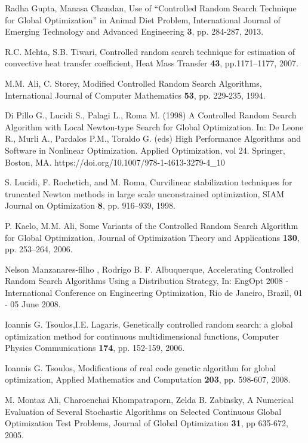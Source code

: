 \documentclass[symmetry,article,submit,moreauthors,pdftex]{Definitions/mdpi}
\begin{document}
\begin{thebibliography}{10}
Radha Gupta, Manasa Chandan, Use of \textquotedblleft Controlled
Random Search Technique for Global Optimization\textquotedblright{}
in Animal Diet Problem, International Journal of Emerging Technology
and Advanced Engineering \textbf{3}, pp. 284-287, 2013.

R.C. Mehta, S.B. Tiwari, Controlled random search
technique for estimation of convective heat transfer coefficient,
Heat Mass Transfer \textbf{43}, pp.1171--1177, 2007.

M.M. Ali, C. Storey, Modified Controlled Random
Search Algorithms, International Journal of Computer Mathematics \textbf{53},
pp. 229-235, 1994.

Di Pillo G., Lucidi S., Palagi L., Roma M. (1998)
A Controlled Random Search Algorithm with Local Newton-type Search
for Global Optimization. In: De Leone R., Murli A., Pardalos P.M.,
Toraldo G. (eds) High Performance Algorithms and Software in Nonlinear
Optimization. Applied Optimization, vol 24. Springer, Boston, MA.
https://doi.org/10.1007/978-1-4613-3279-4\_10

S. Lucidi, F. Rochetich, and M. Roma, Curvilinear
stabilization techniques for truncated Newton methods in large scale
unconstrained optimization, SIAM Journal on Optimization \textbf{8},
pp. 916--939, 1998.

P. Kaelo, M.M. Ali, Some Variants of the Controlled
Random Search Algorithm for Global Optimization, Journal of Optimization
Theory and Applications \textbf{130}, pp. 253--264, 2006.

Nelson Manzanares-filho , Rodrigo B. F. Albuquerque,
Accelerating Controlled Random Search Algorithms Using a Distribution
Strategy, In: EngOpt 2008 - International Conference on Engineering
Optimization, Rio de Janeiro, Brazil, 01 - 05 June 2008. 

 Ioannis G. Tsoulos,I.E. Lagaris, Genetically controlled random search: a global optimization method for continuous multidimensional functions, Computer Physics Communications \textbf{174}, pp. 152-159, 2006.

Ioannis G. Tsoulos, Modifications of real code
genetic algorithm for global optimization, Applied Mathematics and
Computation \textbf{203}, pp. 598-607, 2008.

M. Montaz Ali, Charoenchai Khompatraporn, Zelda B.
Zabinsky, A Numerical Evaluation of Several Stochastic Algorithms
on Selected Continuous Global Optimization Test Problems, Journal
of Global Optimization \textbf{31}, pp 635-672, 2005. 


\end{thebibliography}
\end{document}

